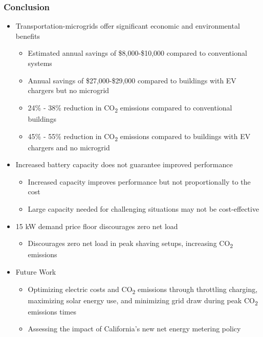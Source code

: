 \documentclass[aspectratio=169, 8 pt]{beamer}
\begin{document}
		\begin{frame}
			\frametitle{Conclusion}
			\begin{itemize} \Large
				\item Transportation-microgrids offer significant economic and environmental benefits
					\begin{itemize} \large
						\item Estimated annual savings of \$8,000-\$10,000 compared to conventional systems
						\item Annual savings of \$27,000-\$29,000 compared to buildings with EV chargers but no microgrid
						\item 24\% - 38\% reduction in CO\textsubscript{2} emissions compared to conventional buildings
						\item 45\% - 55\% reduction in CO\textsubscript{2} emissions compared to buildings with EV chargers and no microgrid
					\end{itemize}
				\item Increased battery capacity does not guarantee improved performance
					\begin{itemize} \large
						\item Increased capacity improves performance but not proportionally to the cost
						\item Large capacity needed for challenging situations may not be cost-effective 
					\end{itemize}
				\item 15 kW demand price floor discourages zero net load
					\begin{itemize} \large
						\item Discourages zero net load in peak shaving setups, increasing CO\textsubscript{2} emissions
					\end{itemize}
				\item Future Work
					\begin{itemize} \large
						\item Optimizing electric costs and CO\textsubscript{2} emissions through throttling charging, maximizing solar energy use, and minimizing grid draw during peak CO\textsubscript{2} emissions times
						\item Assessing the impact of California's new net energy metering policy
					\end{itemize}
			\end{itemize}

\end{frame}
\end{document}

